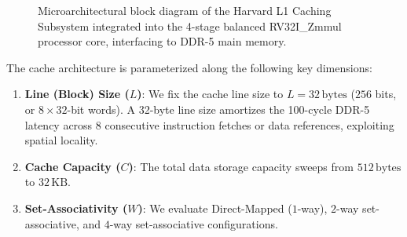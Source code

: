 \begin{figure}[htbp]
\caption{Microarchitectural block diagram of the Harvard L1 Caching Subsystem integrated into the 4-stage balanced RV32I\_Zmmul processor core, interfacing to DDR-5 main memory.}\label{fig:riscv_cache_system}
\end{figure}

The cache architecture is parameterized along the following key dimensions:
\begin{enumerate}
    \item \textbf{Line (Block) Size ($L$)}: We fix the cache line size to $L = 32\,\text{bytes}$ ($256$ bits, or $8 \times 32$-bit words). A 32-byte line size amortizes the 100-cycle DDR-5 latency across 8 consecutive instruction fetches or data references, exploiting spatial locality.
    \item \textbf{Cache Capacity ($C$)}: The total data storage capacity sweeps from $512\,\text{bytes}$ to $32\,\text{KB}$.
    \item \textbf{Set-Associativity ($W$)}: We evaluate Direct-Mapped ($1$-way), $2$-way set-associative, and $4$-way set-associative configurations.
\end{enumerate}

